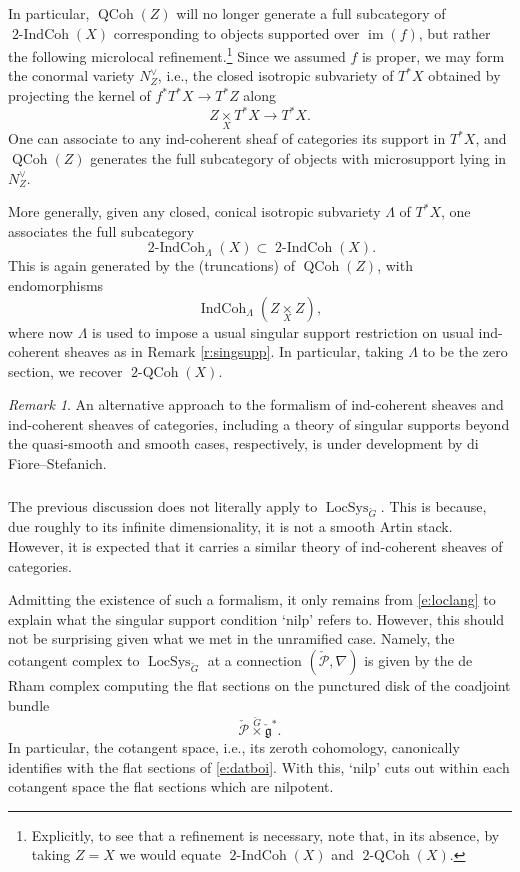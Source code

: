 \documentclass[10pt]{amsart}
\newcommand{\TwoCoh}{\on{2-QCoh}}
\newcommand{\LS}{\on{LocSys}_{\cG}}
\newcommand{\fg}{\mathfrak{g}}
\newcommand{\on}{\operatorname}
\theoremstyle{remark}
\newtheorem{re}[subsubsection]{Remark}
\newcommand{\sP}{\mathscr{P}}
\numberwithin{equation}{section}
\newcommand{\cfg}{\check{\fg}}
\newcommand{\cG}{\check{G}}
\newcommand{\QCoh}{\on{QCoh}}
\begin{document}
In particular, $\QCoh(Z)$ will no longer generate a full subcategory of 
$\on{2-IndCoh}(X)$ corresponding to objects supported over $\on{im}(f)$, but 
rather 
the following microlocal refinement.\footnote{Explicitly, to see that a refinement is necessary, 
note that, in its absence, by taking $Z = X$ we would equate $\on{2-IndCoh}(X)$ and $\TwoCoh(X)$.}  Since we 
assumed $f$ is proper, we may form the conormal variety $N^\vee_{Z}$, i.e., the 
closed isotropic subvariety of $T^*X$ obtained by projecting the kernel of $f^* 
T^*X \rightarrow T^*Z$ along $$Z \underset X \times T^*X \rightarrow T^*X.$$ 
One can associate to any ind-coherent sheaf of categories its support in 
$T^*X$, and $\QCoh(Z)$ generates the full subcategory of objects with 
microsupport lying in $N^\vee_Z$. 


More generally, given any closed, conical isotropic subvariety $\Lambda$ of 
$T^*X$, one associates the full subcategory
%
$$
\on{2-IndCoh}_\Lambda(X) \subset \on{2-IndCoh}(X).
$$
%
This is again generated by the (truncations) of $\QCoh(Z)$, with endomorphisms 
$$\on{IndCoh}_\Lambda(Z \underset X \times Z),$$where now $\Lambda$ is used to 
impose a usual singular support restriction on usual ind-coherent sheaves as in 
Remark \ref{r:singsupp}. In particular, taking $\Lambda$ to be the zero 
section, we recover $\TwoCoh(X)$. 


\begin{re} An alternative approach to the formalism of ind-coherent sheaves and ind-coherent sheaves of categories, including a theory of singular supports beyond the quasi-smooth and smooth cases, respectively,   is under development by di Fiore--Stefanich. \end{re}

\subsubsection{} The previous discussion does not literally apply to $\LS$. This is because, due 
roughly to its infinite dimensionality, it is not a smooth Artin stack. However, it is 
expected that it carries a similar theory of ind-coherent sheaves of 
categories. 


Admitting the existence of such a formalism, it only remains from \eqref{e:loclang} to explain what the 
singular 
support condition `nilp' refers to. However, this should  not be surprising 
given what we met in the unramified case. Namely, the cotangent complex to $\LS$ 
at a 
connection $(\check{\sP}, \nabla)$ is given by the de Rham complex computing the flat sections on the punctured disk of the coadjoint bundle 
%
\begin{equation} \label{e:datboi}
   \check{\sP} \overset{\cG} \times \cfg^*. 
\end{equation}
%
In particular, the cotangent space, i.e., its zeroth cohomology, canonically identifies with the flat sections of 
\eqref{e:datboi}. With this, `nilp' cuts out within each cotangent space the flat 
sections which are nilpotent. 
\end{document}
